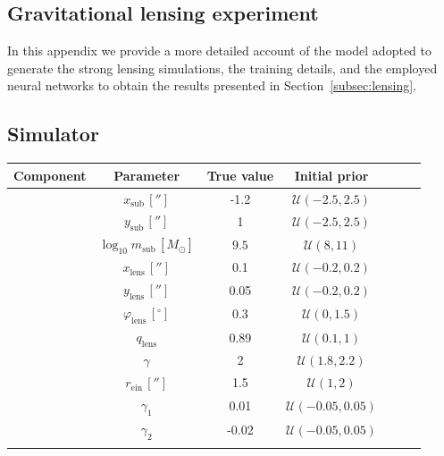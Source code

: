 \begin{subappendices}
\section{Gravitational lensing experiment}
\label{apx:anre-lensing}

In this appendix we provide a more detailed account of the model adopted to generate the strong lensing simulations, the training details, and the employed neural networks to obtain the results presented in Section~\ref{subsec:lensing}.
\clearpage

\subsection{Simulator}

\begin{table}
    \centering
    \renewcommand{\arraystretch}{1.2}
    \begin{tabular}{c c c c c c c}
        \hline
        Component & Parameter & True value & Initial prior  \\
        \hline
        \parbox[t]{1mm}{}
        & $x_\mathrm{sub}\, ['']$ & -1.2 & $\mathcal{U}(-2.5, 2.5)$ \\
        & $y_\mathrm{sub}\, ['']$ & 1 & $\mathcal{U}(-2.5, 2.5)$ \\
        & $\log_{10} m_\mathrm{sub}\, [M_\odot]$ & $9.5$ & $\mathcal{U}(8, 11)$ \\
        \hline
        \parbox[t]{1mm}{}
        & $x_\mathrm{lens}\, ['']$ & 0.1 & $\mathcal{U}(-0.2, 0.2)$  \\
        & $y_\mathrm{lens}\, ['']$ & 0.05 & $\mathcal{U}(-0.2, 0.2)$ \\
        & $\varphi_\mathrm{lens} \, [^\circ]$ & 0.3 & $\mathcal{U}(0, 1.5)$ \\
        & $q_\mathrm{lens}$ & 0.89 & $\mathcal{U}(0.1, 1)$ \\
        & $\gamma$ & 2 & $\mathcal{U}(1.8, 2.2)$ \\
        & $r_\mathrm{ein}\, ['']$ & 1.5 & $\mathcal{U}(1, 2)$ \\
        \hline
        \parbox[t]{1mm}{}
        & $\gamma_1$ & 0.01 & $\mathcal{U}(-0.05, 0.05)$  \\
        & $\gamma_2$ & -0.02 & $\mathcal{U}(-0.05, 0.05)$ \\
        \hline
        \parbox[t]{1mm}{}

\end{tabular}
\end{table}
\end{subappendices}
